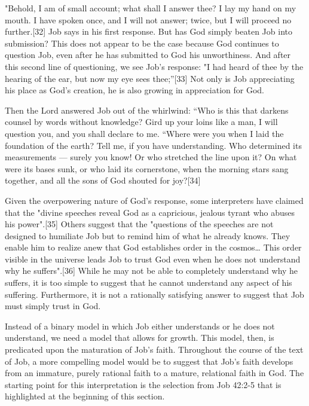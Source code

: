 "Behold, I am of small account; what shall I answer thee? I lay my hand on my mouth. I have spoken once, and I will not answer; twice, but I will proceed no further.[32] Job says in his first response. But has God simply beaten Job into submission? This does not appear to be the case because God continues to question Job, even after he has submitted to God his unworthiness. And after this second line of questioning, we see Job's response: "I had heard of thee by the hearing of the ear, but now my eye sees thee;”[33] Not only is Job appreciating his place as God's creation, he is also growing in appreciation for God.


Then the Lord answered Job out of the whirlwind: “Who is this that darkens counsel by words without knowledge? Gird up your loins like a man, I will question you, and you shall declare to me. “Where were you when I laid the foundation of the earth? Tell me, if you have understanding. Who determined its measurements — surely you know! Or who stretched the line upon it? On what were its bases sunk, or who laid its cornerstone, when the morning stars sang together, and all the sons of God shouted for joy?[34]


Given the overpowering nature of God's response, some interpreters have claimed that the "divine speeches reveal God as a capricious, jealous tyrant who abuses his power".[35] Others suggest that the "questions of the speeches are not designed to humiliate Job but to remind him of what he already knows. They enable him to realize anew that God establishes order in the cosmos… This order visible in the universe leads Job to trust God even when he does not understand why he suffers".[36] While he may not be able to completely understand why he suffers, it is too simple to suggest that he cannot understand any aspect of his suffering. Furthermore, it is not a rationally satisfying answer to suggest that Job must simply trust in God.

Instead of a binary model in which Job either understands or he does not understand, we need a model that allows for growth. This model, then, is predicated upon the maturation of Job's faith. Throughout the course of the text of Job, a more compelling model would be to suggest that Job's faith develops from an immature, purely rational faith to a mature, relational faith in God. The starting point for this interpretation is the selection from Job 42:2-5 that is highlighted at the beginning of this section.

